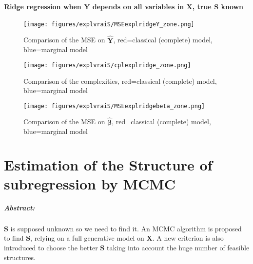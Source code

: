 \documentclass[12pt,a4paper]{report}
\begin{document}
\subsubsection{Ridge regression when $\boldsymbol{Y}$ depends on all variables in $\boldsymbol{X}$, true $\boldsymbol{S}$ known}

\begin{figure}[h!]
	\centering
		  \texttt{[image: figures/explvraiS/MSEexplridgeY\_zone.png]}
		\caption{Comparison of the MSE on $\hat{\boldsymbol{Y}}$, red=classical (complete) model, blue=marginal model}\label{MSEexplridgeY_zone}
	\end{figure}
	\begin{figure}[h!]
	\centering
		  \texttt{[image: figures/explvraiS/cplexplridge\_zone.png]}
		\caption{Comparison of the complexities, red=classical (complete) model, blue=marginal model}\label{cplexplridge_zone}
	\end{figure}
	\begin{figure}[h!]
	\centering
		  \texttt{[image: figures/explvraiS/MSEexplridgebeta\_zone.png]}
		\caption{Comparison of the MSE on $\hat{\boldsymbol{\beta}}$, red=classical (complete) model, blue=marginal model}\label{MSEexplridgebeta_zone}
	\end{figure}
	\FloatBarrier

\chapter{Estimation of the Structure of subregression by MCMC}\label{chapterMCMC}
\paragraph{Abstract:} $\boldsymbol{S}$ is supposed unknown so we need to find it. An MCMC algorithm is proposed to find $\boldsymbol{S}$, relying on a full generative model on $\boldsymbol{X}$. A new criterion is also introduced to choose the better $\boldsymbol{S}$ taking into account the huge number of feasible structures.
 \\
\\
\end{document}
